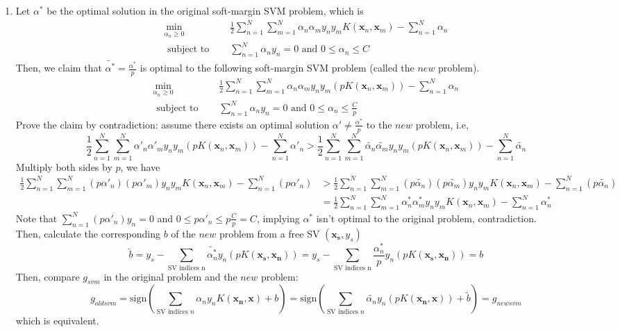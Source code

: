 \documentclass{article}
\begin{document}
\begin{CJK*}{UTF8}{bsmi}
\begin{normalsize}
\begin{enumerate}[label=\textbf{\arabic*}.]
        \item Let $\alpha^*$ be the optimal solution in the original soft-margin SVM problem, which is
        \begin{align*}
            \min_{\alpha_n \ge 0}\enspace \enspace& \frac{1}{2}\sum_{n=1}^N\sum_{m=1}^N \alpha_n \alpha_m y_n y_m K(\mathbf{x}_n, \mathbf{x}_m) - \sum_{n=1}^N \alpha_n\\
            \text{ subject to }\enspace \enspace& \sum_{n=1}^N \alpha_n y_n = 0 \text{ and }0\le\alpha_n \le C
        \end{align*}
        Then, we claim that $\tilde{\alpha^*} = \frac{\alpha^*}{p}$ is optimal to the following soft-margin SVM problem (called the $new$ problem).
        \begin{align*}
            \min_{\alpha_n \ge 0}\enspace \enspace& \frac{1}{2}\sum_{n=1}^N\sum_{m=1}^N \alpha_n \alpha_m y_n y_m (pK(\mathbf{x}_n, \mathbf{x}_m)) - \sum_{n=1}^N \alpha_n\\
            \text{ subject to }\enspace \enspace& \sum_{n=1}^N \alpha_n y_n = 0 \text{ and }0\le\alpha_n \le \frac{C}{p}
        \end{align*}
        Prove the claim by contradiction: assume there exists an optimal solution $\alpha' \neq \frac{\alpha^*}{p}$ to the $new$ problem, i.e,
        \[ \frac{1}{2}\sum_{n=1}^N\sum_{m=1}^N \alpha'_n \alpha'_m y_n y_m (pK(\mathbf{x}_n, \mathbf{x}_m)) - \sum_{n=1}^N \alpha'_n > \frac{1}{2}\sum_{n=1}^N\sum_{m=1}^N \tilde{\alpha_n} \tilde{\alpha_m} y_n y_m (pK(\mathbf{x}_n, \mathbf{x}_m)) - \sum_{n=1}^N \tilde{\alpha_n} \]
        Multiply both sides by $p$, we have
        \begin{align*} \frac{1}{2}\sum_{n=1}^N\sum_{m=1}^N (p\alpha'_n) (p\alpha'_m) y_n y_m K(\mathbf{x}_n, \mathbf{x}_m) - \sum_{n=1}^N (p\alpha'_n) &> \frac{1}{2}\sum_{n=1}^N\sum_{m=1}^N (p\tilde{\alpha_n}) (p\tilde{\alpha_m}) y_n y_m K(\mathbf{x}_n, \mathbf{x}_m) - \sum_{n=1}^N (p\tilde{\alpha_n})\\
        &= \frac{1}{2}\sum_{n=1}^N\sum_{m=1}^N \alpha^*_n \alpha^*_m y_n y_m K(\mathbf{x}_n, \mathbf{x}_m) - \sum_{n=1}^N \alpha^*_n
        \end{align*}
        Note that $\sum_{n=1}^N (p\alpha'_n) y_n = 0$ and $0 \le p\alpha'_n \le p\frac{C}{p} = C$, implying $\alpha^*$ isn't optimal to the original problem, contradiction.\\
        Then, calculate the corresponding $b$ of the $new$ problem from a free SV $(\mathbf{x_s}, y_s)$
        \[ \tilde{b} = y_s - \sum_{\text{SV indices n}} \tilde{\alpha^*_n} y_n (pK(\mathbf{x_s}, \mathbf{x_n})) = y_s - \sum_{\text{SV indices n}} \frac{\alpha^*_n}{p} y_n (pK(\mathbf{x_s}, \mathbf{x_n})) = b \]
        Then, compare $g_{svm}$ in the original problem and the $new$ problem:
        \[ g_{oldsvm} = \text{sign}(\sum_{\text{SV indices }n}\alpha_n y_n K(\mathbf{x_n}, \mathbf{x})+b) = \text{sign}(\sum_{\text{SV indices }n}\tilde{\alpha_n} y_n (pK(\mathbf{x_n}, \mathbf{x}))+\tilde{b}) = g_{newsvm} \]
        which is equivalent.
        

\end{enumerate}
\end{normalsize}
\end{CJK*}
\end{document}
